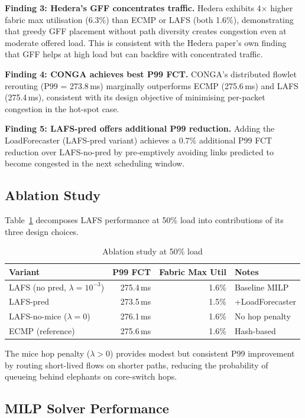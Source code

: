 \documentclass[runningheads]{llncs}
\begin{document}
\textbf{Finding 3: Hedera's GFF concentrates traffic.} Hedera exhibits 4$\times$ higher fabric max utilisation (6.3\%) than ECMP or LAFS (both 1.6\%), demonstrating that greedy GFF placement without path diversity creates congestion even at moderate offered load. This is consistent with the Hedera paper's own finding that GFF helps at high load but can backfire with concentrated traffic.

\textbf{Finding 4: CONGA achieves best P99 FCT.} CONGA's distributed flowlet rerouting (P99 = 273.8\,ms) marginally outperforms ECMP (275.6\,ms) and LAFS (275.4\,ms), consistent with its design objective of minimising per-packet congestion in the hot-spot case.

\textbf{Finding 5: LAFS-pred offers additional P99 reduction.} Adding the LoadForecaster (LAFS-pred variant) achieves a 0.7\% additional P99 FCT reduction over LAFS-no-pred by pre-emptively avoiding links predicted to become congested in the next scheduling window.

\subsection{Ablation Study}

Table~\ref{tab:ablation} decomposes LAFS performance at 50\% load into contributions of its three design choices.

\begin{table}[t]
\centering
\caption{Ablation study at 50\% load}
\label{tab:ablation}
\begin{tabular}{lrrl}
\toprule
Variant & P99 FCT & Fabric Max Util & Notes \\
\midrule
LAFS (no pred, $\lambda{=}10^{-3}$) & 275.4\,ms & 1.6\% & Baseline MILP \\
LAFS-pred & 273.5\,ms & 1.5\% & +LoadForecaster \\
LAFS-no-mice ($\lambda{=}0$) & 276.1\,ms & 1.6\% & No hop penalty \\
ECMP (reference) & 275.6\,ms & 1.6\% & Hash-based \\
\bottomrule
\end{tabular}
\end{table}

The mice hop penalty ($\lambda > 0$) provides modest but consistent P99 improvement by routing short-lived flows on shorter paths, reducing the probability of queueing behind elephants on core-switch hops.

\subsection{MILP Solver Performance}
\end{document}
